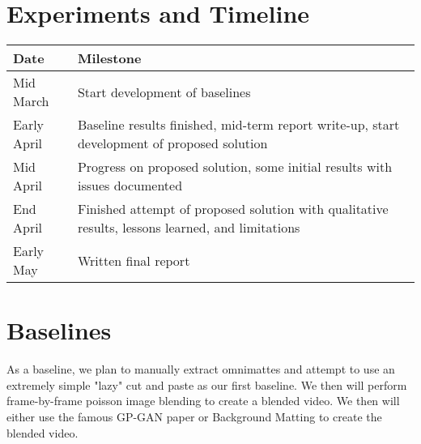 \documentclass{article}
\begin{document}
\section{Experiments and Timeline}
\begin{center}
\begin{tabular}{|| p{2cm} | p{12cm} ||}
    \hline
    \textbf{Date} & \textbf{Milestone} \\
    \hline
    Mid March & Start development of baselines \\
    \hline
    Early April & Baseline results finished, mid-term report write-up, start development of proposed solution \\
    \hline
    Mid April & Progress on proposed solution, some initial results with issues documented \\
    \hline
    End April & Finished attempt of proposed solution with qualitative results, lessons learned, and limitations\\
    \hline
    Early May & Written final report \\
    \hline
\end{tabular}
\end{center}

\section{Baselines}
As a baseline, we plan to manually extract omnimattes and attempt to use an extremely simple "lazy" cut and paste as our first baseline. We then will perform frame-by-frame poisson image blending to create a blended video. We then will either use the famous GP-GAN paper or Background Matting \cite{BMSengupta20} to create the blended video.


\printbibliography
\end{document}
